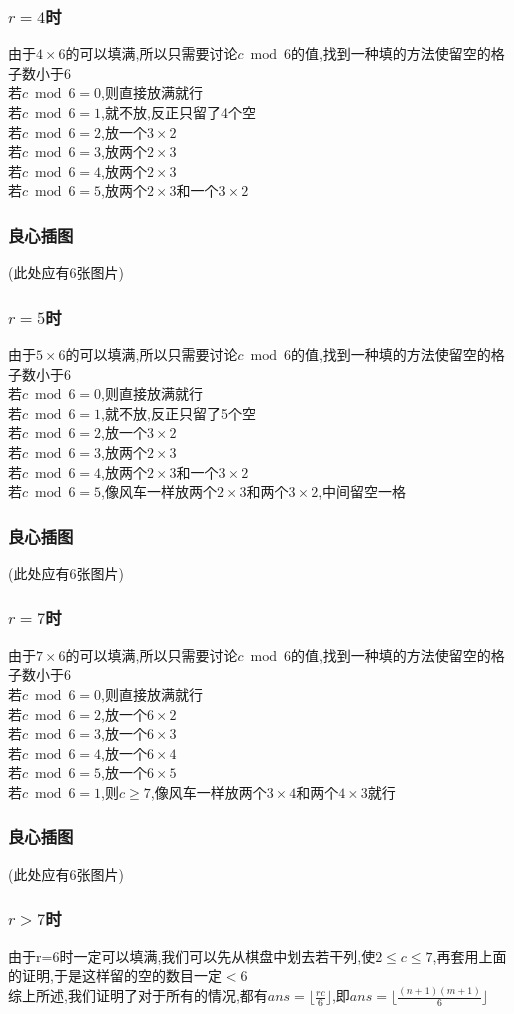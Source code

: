 \documentclass{beamer}
\begin{document}
			\begin{frame}\frametitle{$r=4$时}
				由于$4\times6$的可以填满,所以只需要讨论$c\bmod6$的值,找到一种填的方法使留空的格子数小于6\\
				若$c\bmod6=0$,则直接放满就行\\
				若$c\bmod6=1$,就不放,反正只留了4个空\\
				若$c\bmod6=2$,放一个$3\times2$\\
				若$c\bmod6=3$,放两个$2\times3$\\
				若$c\bmod6=4$,放两个$2\times3$\\
				若$c\bmod6=5$,放两个$2\times3$和一个$3\times2$\\
			\end{frame}
			\begin{frame}\frametitle{良心插图}
				(此处应有6张图片)
			\end{frame}
			\begin{frame}\frametitle{$r=5$时}
				由于$5\times6$的可以填满,所以只需要讨论$c\bmod6$的值,找到一种填的方法使留空的格子数小于6\\
				若$c\bmod6=0$,则直接放满就行\\
				若$c\bmod6=1$,就不放,反正只留了5个空\\
				若$c\bmod6=2$,放一个$3\times2$\\
				若$c\bmod6=3$,放两个$2\times3$\\
				若$c\bmod6=4$,放两个$2\times3$和一个$3\times2$\\
				若$c\bmod6=5$,像风车一样放两个$2\times3$和两个$3\times2$,中间留空一格\\
			\end{frame}
			\begin{frame}\frametitle{良心插图}
				(此处应有6张图片)
			\end{frame}
			\begin{frame}\frametitle{$r=7$时}
				由于$7\times6$的可以填满,所以只需要讨论$c\bmod6$的值,找到一种填的方法使留空的格子数小于6\\
				若$c\bmod6=0$,则直接放满就行\\
				若$c\bmod6=2$,放一个$6\times2$\\
				若$c\bmod6=3$,放一个$6\times3$\\
				若$c\bmod6=4$,放一个$6\times4$\\
				若$c\bmod6=5$,放一个$6\times5$\\
				若$c\bmod6=1$,则$c\ge7$,像风车一样放两个$3\times4$和两个$4\times3$就行\\
			\end{frame}
			\begin{frame}\frametitle{良心插图}
				(此处应有6张图片)
			\end{frame}
			\begin{frame}\frametitle{$r>7$时}
				由于r=6时一定可以填满,我们可以先从棋盘中划去若干列,使$2\le c\le7$,再套用上面的证明,于是这样留的空的数目一定$<6$\\
				综上所述,我们证明了对于所有的情况,都有$ans=\lfloor\frac{rc}{6}\rfloor$,即$ans=\lfloor\frac{(n+1)(m+1)}6\rfloor$
			\end{frame}
\end{document}
